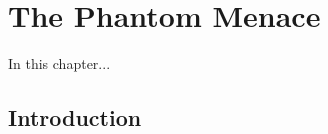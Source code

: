 \chapter{The Phantom Menace}

\graphicspath{{figures/chapter-2/}}


\begin{synopsis}
	In this chapter...
\end{synopsis}


\section{Introduction}

\lipsum[1-4] 
\cite{Lorch1969}

